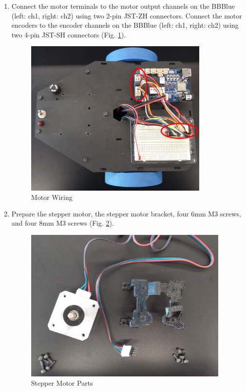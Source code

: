 \begin{enumerate}[label = \textbf{Step \arabic*.}]
    \item Connect the motor terminals to the motor output channels on the BBBlue (left: ch1, right: ch2) using two 2-pin JST-ZH connectors. Connect the motor encoders to the encoder channels on the BBBlue (left: ch1, right: ch2) using two 4-pin JST-SH connectors (Fig. \ref{fig:motorWiring}).
    \begin{figure}[H]
        \centering
        \includegraphics[width=3.6in]{figs/img/assembly/03-motorWiring.png}
        \caption{Motor Wiring}
        \label{fig:motorWiring}
    \end{figure}

    \item Prepare the stepper motor, the stepper motor bracket, four 6mm M3 screws, and four 8mm M3 screws (Fig. \ref{fig:stepperParts}).
    \begin{figure}[H]
        \centering
        \includegraphics[width=4in]{figs/img/assembly/04-stepperParts.jpg}
        \caption{Stepper Motor Parts}
        \label{fig:stepperParts}
    \end{figure}


\end{enumerate}
